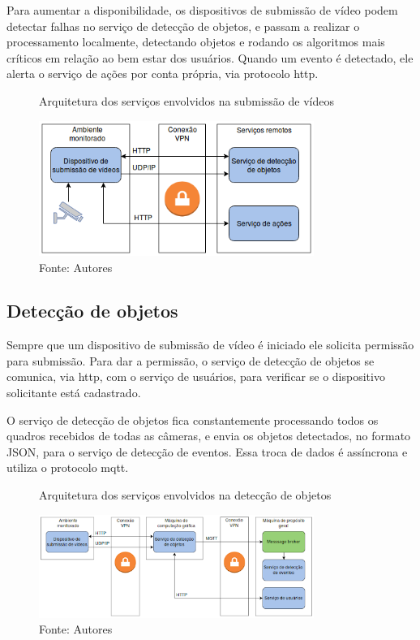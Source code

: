 \documentclass[]{politex}
\begin{document}
Para aumentar a disponibilidade, os dispositivos de submissão de vídeo podem detectar falhas no serviço de detecção de objetos, e passam a realizar o processamento localmente, detectando objetos e rodando os algoritmos mais críticos em relação ao bem estar dos usuários. Quando um evento é detectado, ele alerta o serviço de ações por conta própria, via protocolo \acrshort{http}.

\begin{figure}[H]
    \centering
    \caption{Arquitetura dos serviços envolvidos na submissão de vídeos}
    \includegraphics[width=0.8\textwidth]{arquitetura_sub_videos}
    \caption*{Fonte: Autores}
    \label{fig:arquitetura_video}
\end{figure}

\subsection{Detecção de objetos}
Sempre que um dispositivo de submissão de vídeo é iniciado ele solicita permissão para submissão. Para dar a permissão, o serviço de detecção de objetos se comunica, via \acrshort{http}, com o serviço de usuários, para verificar se o dispositivo solicitante está cadastrado.

O serviço de detecção de objetos fica constantemente processando todos os quadros recebidos de todas as câmeras, e envia os objetos detectados, no formato JSON, para o serviço de detecção de eventos. Essa troca de dados é assíncrona e utiliza o protocolo \acrshort{mqtt}.

\begin{figure}[H]
    \centering
    \caption{Arquitetura dos serviços envolvidos na detecção de objetos}
    \includegraphics[width=0.8\textwidth]{arquitetura_objetos}
    \caption*{Fonte: Autores}
    \label{fig:arquitetura_objetos}
\end{figure}
\end{document}

